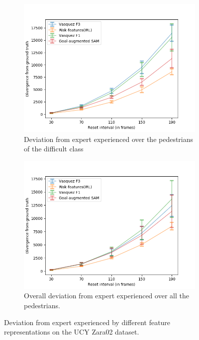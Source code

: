 \begin{figure}[htbp]
\begin{subfigure}{0.5\textwidth}
		\label{fig:inter_IRL-drift_analysis_med-zara02}
	\end{subfigure}
	\begin{subfigure}{0.5\textwidth}
		\centering
		\includegraphics[width=\linewidth]{plots/plot_without_outliers/zara02_inter_irl_no_outlier/Zara02_irl_hard.png}
		\caption {Deviation from expert experienced over the pedestrians of the difficult class}
		\label{fig:inter_IRL-drift_analysis_hard-zara02}
	\end{subfigure}
	\begin{subfigure}{0.5\textwidth}
		\centering
		\includegraphics[width=\linewidth]{plots/plot_without_outliers/zara02_inter_irl_no_outlier/Zara02_irl_all.png}
		\caption {Overall deviation from expert experienced over all the pedestrians.}
		\label{fig:inter_IRL-drift_analysis_all-zara02}
	\end{subfigure}
	\caption{Deviation from expert experienced by different feature representations on the UCY Zara02 dataset.}
	\label{fig:drift_analysis-inter_IRL-zara02}
\end{figure}


